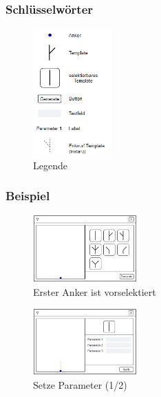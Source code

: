 \documentclass[12pt]{beamer}
\begin{document}
    \begin{frame}[fragile]
        \frametitle{Schlüsselwörter}
        \begin{figure}
            \centering
            \includegraphics[width=3cm]{../images/UI_Legende.PNG}
            \caption{Legende}
        \end{figure}
    \end{frame}

    \begin{frame}
        \frametitle{Beispiel}
        \begin{figure}
            \centering
            \includegraphics[width=4cm]{../images/UI_1.PNG}
            \caption{Erster Anker ist vorselektiert}
        \end{figure}
        \begin{figure}
            \centering
            \includegraphics[width=4cm]{../images/UI_2.PNG}
            \caption{Setze Parameter (1/2)}
        \end{figure}
    \end{frame}
\end{document}
